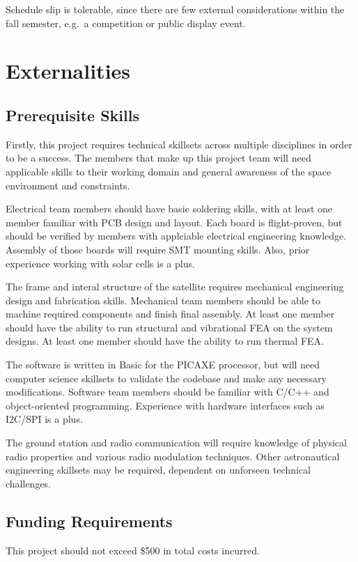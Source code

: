 \documentclass[conference]{IEEEtran} %
\begin{document}
Schedule slip is tolerable, since there are few external considerations within the fall semester, e.g.\ a competition or public display event.
\section{Externalities}
\subsection{Prerequisite Skills}
Firstly, this project requires technical skillsets across multiple disciplines in order to be a success.
The members that make up this project team will need applicable skills to their working domain and general awareness of the space environment and constraints.

Electrical team members should have basic soldering skills, with at least one member familiar with PCB design and layout.
Each board is flight-proven, but should be verified by members with applciable electrical engineering knowledge.
Assembly of those boards will require SMT mounting skills.
Also, prior experience working with solar cells is a plus.

The frame and interal structure of the satellite requires mechanical engineering design and fabrication skills.
Mechanical team members should be able to machine required components and finish final assembly.
At least one member should have the ability to run structural and vibrational FEA on the system designs.
At least one member should have the ability to run thermal FEA.\@

The software is written in Basic for the PICAXE processor, but will need computer science skillsets to validate the codebase and make any necessary modifications.
Software team members should be familiar with C/C++ and object-oriented programming.
Experience with hardware interfaces such as I2C/SPI is a plus.

The ground station and radio communication will require knowledge of physical radio properties and various radio modulation techniques.
Other astronautical engineering skillsets may be required, dependent on unforseen technical challenges.


\subsection{Funding Requirements}
This project should not exceed \$500 in total costs incurred.
\end{document}
